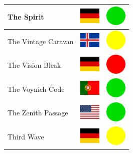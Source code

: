 \documentclass[12pt, a4paper, twoside]{report}
\begin{document}
\begin{center}
\begin{longtable}{|p{5cm}|p{2cm}|p{2cm}|}
 The Spirit                                                 & \includegraphics[width=1cm]{../img/flags/de} &   \includegraphics[width=1cm]{../likes/y} \\ \hline
 The Vintage Caravan                                        & \includegraphics[width=1cm]{../img/flags/is} &   \includegraphics[width=1cm]{../likes/m} \\ \hline
 The Vision Bleak                                           & \includegraphics[width=1cm]{../img/flags/de} &   \includegraphics[width=1cm]{../likes/n} \\ \hline
 The Voynich Code                                           & \includegraphics[width=1cm]{../img/flags/pt} &   \includegraphics[width=1cm]{../likes/y} \\ \hline
 The Zenith Passage                                         & \includegraphics[width=1cm]{../img/flags/us} &   \includegraphics[width=1cm]{../likes/y} \\ \hline
 Third Wave                                                 & \includegraphics[width=1cm]{../img/flags/de} &   \includegraphics[width=1cm]{../likes/m} \\ \hline

\end{longtable}
\end{center}
\end{document}
